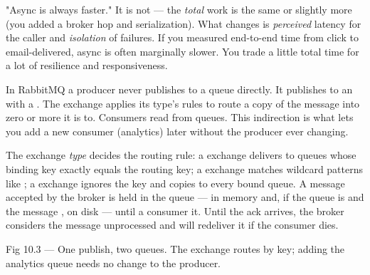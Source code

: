 \begin{misconception}
"Async is always faster." It is not --- the \emph{total} work is the same or slightly more (you added a broker hop and serialization). What changes is \emph{perceived} latency for the caller and \emph{isolation} of failures. If you measured end-to-end time from click to email-delivered, async is often marginally slower. You trade a little total time for a lot of resilience and responsiveness.
\end{misconception}


 In RabbitMQ a producer never publishes to a queue directly. It publishes to an  with a . The exchange applies its type's rules to route a copy of the message into zero or more  it is  to. Consumers read from queues. This indirection is what lets you add a new consumer (analytics) later without the producer ever changing.

 The exchange \emph{type} decides the routing rule: a  exchange delivers to queues whose binding key exactly equals the routing key; a  exchange matches wildcard patterns like ; a  exchange ignores the key and copies to every bound queue. A message accepted by the broker is held in the queue --- in memory and, if the queue is  and the message , on disk --- until a consumer  it. Until the ack arrives, the broker considers the message unprocessed and will redeliver it if the consumer dies.

\begin{wbfigure}{Fig 10.3 --- One publish, two queues. The exchange routes by key; adding the analytics queue needs no change to the producer.}
\end{wbfigure}

